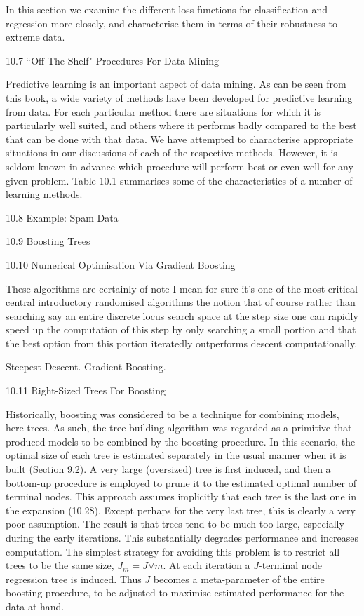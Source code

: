 In this section we examine the different loss functions for classification and regression more closely, and characterise them in terms of their robustness to extreme data.

10.7 ``Off-The-Shelf" Procedures For Data Mining

Predictive learning is an important aspect of data mining. As can be seen from this book, a wide variety of methods have been developed for predictive learning from data. For each particular method there are situations for which it is particularly well suited, and others where it performs badly compared to the best that can be done with that data. We have attempted to characterise appropriate situations in our discussions of each of the respective methods. However, it is seldom known in advance which procedure will perform best or even well for any given problem. Table 10.1 summarises some of the characteristics of a number of learning methods.

10.8 Example: Spam Data



10.9 Boosting Trees



10.10 Numerical Optimisation Via Gradient Boosting

These algorithms are certainly of note I mean for sure it's one of the most critical central introductory randomised algorithms the notion that of course rather than searching say an entire discrete locus search space at the step size one can rapidly speed up the computation of this step by only searching a small portion and that the best option from this portion iteratedly outperforms descent computationally.

Steepest Descent. Gradient Boosting.

10.11 Right-Sized Trees For Boosting

Historically, boosting was considered to be a technique for combining models, here trees. As such, the tree building algorithm was regarded as a primitive that produced models to be combined by the boosting procedure. In this scenario, the optimal size of each tree is estimated separately in the usual manner when it is built (Section 9.2). A very large (oversized) tree is first induced, and then a bottom-up procedure is employed to prune it to the estimated optimal number of terminal nodes. This approach assumes implicitly that each tree is the last one in the expansion (10.28). Except perhaps for the very last tree, this is clearly a very poor assumption. The result is that trees tend to be much too large, especially during the early iterations. This substantially degrades performance and increases computation. The simplest strategy for avoiding this problem is to restrict all trees to be the same size, $J_m = J \forall m$. At each iteration a $J$-terminal node regression tree is induced. Thus $J$ becomes a meta-parameter of the entire boosting procedure, to be adjusted to maximise estimated performance for the data at hand.

